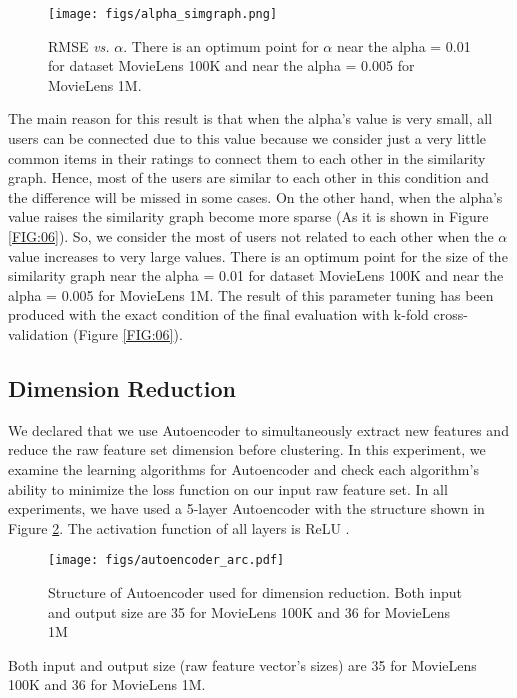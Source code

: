 \documentclass[a4paper,fleqn]{cas-dc}
\begin{document}
\begin{figure}
	\centering
	\texttt{[image: figs/alpha\_simgraph.png]}
	\caption{RMSE \textit{vs.} $\alpha$. There is an optimum point for $\alpha$ near the alpha = 0.01 for dataset MovieLens 100K and near the alpha = 0.005 for MovieLens 1M.}
	\label{FIG:07}
\end{figure}


The main reason for this result is that when the alpha's value is very small, all users can be connected due to this value because we consider just a very little common items in their ratings to connect them to each other in the similarity graph. Hence, most of the users are similar to each other in this condition and the difference will be missed in some cases. On the other hand, when the alpha's value raises the similarity graph become more sparse (As it is shown in Figure \ref{FIG:06}). So, we consider the most of users not related to each other when the $\alpha$ value increases to very large values. There is an optimum point for the size of the similarity graph near the alpha = 0.01 for dataset MovieLens 100K and near the alpha = 0.005 for MovieLens 1M. The result of this parameter tuning has been produced with the exact condition of the final evaluation with k-fold cross-validation (Figure \ref{FIG:06}).

\subsection{Dimension Reduction}
\label{test:dr}
We declared that we use Autoencoder to simultaneously extract new features and reduce the raw feature set dimension before clustering. In this experiment, we examine the learning algorithms for Autoencoder and check each algorithm's ability to minimize the loss function on our input raw feature set. In all experiments, we have used a 5-layer Autoencoder with the structure shown in Figure \ref{FIG:08}. The activation function of all layers is ReLU \citep{62nair2010rectified}.

\begin{figure}
	\centering
	\texttt{[image: figs/autoencoder\_arc.pdf]}
	\caption{Structure of Autoencoder used for dimension reduction. Both input and output size are 35 for MovieLens 100K and 36 for MovieLens 1M}
	\label{FIG:08}
\end{figure}

Both input and output size (raw feature vector's sizes) are 35 for MovieLens 100K and 36 for MovieLens 1M.
\end{document}
